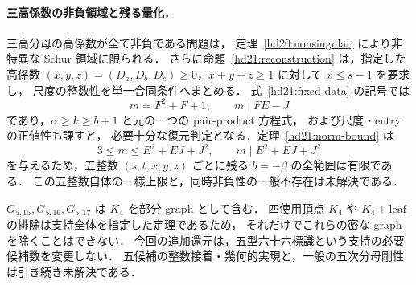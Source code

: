 \paragraph{三高係数の非負領域と残る量化．}
三高分母の高係数が全て非負である問題は，
定理~\ref{hd20:nonsingular} により非特異な Schur 領域に限られる．
さらに命題~\ref{hd21:reconstruction} は，指定した高係数
$(x,y,z)=(D_a,D_b,D_c)\ge0$，$x+y+z\ge1$ に対して $x\le s-1$ を要求し，
尺度の整数性を単一合同条件へまとめる．
式~\eqref{hd21:fixed-data} の記号では
\[
 m=F^2+F+1,\qquad m\mid FE-J
\]
であり，$\alpha\ge k\ge b+1$ と元の一つの pair-product 方程式，
および尺度・entry の正値性も課すと，
必要十分な復元判定となる．定理~\ref{hd21:norm-bound} は
\[
 3\le m\le E^2+EJ+J^2,\qquad m\mid E^2+EJ+J^2
\]
を与えるため，五整数 $(s,t,x,y,z)$ ごとに残る $b=-\beta$ の全範囲は有限である．
この五整数自体の一様上限と，同時非負性の一般不存在は未解決である．

$G_{5,15},G_{5,16},G_{5,17}$ は $K_4$ を部分 graph として含む．
四使用頂点 $K_4$ や $K_4+\mathrm{leaf}$ の排除は支持全体を指定した定理であるため，
それだけでこれらの密な graph を除くことはできない．
今回の追加還元は，五型六十六標識という支持の必要候補数を変更しない．
五候補の整数接着・幾何的実現と，一般の五次分母剛性は引き続き未解決である．

